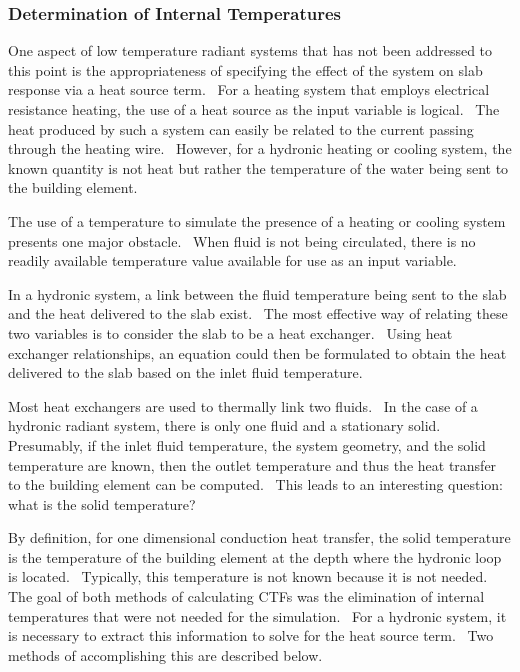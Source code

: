 \subsubsection{Determination of Internal Temperatures}\label{determination-of-internal-temperatures}

One aspect of low temperature radiant systems that has not been addressed to this point is the appropriateness of specifying the effect of the system on slab response via a heat source term.~ For a heating system that employs electrical resistance heating, the use of a heat source as the input variable is logical.~ The heat produced by such a system can easily be related to the current passing through the heating wire.~ However, for a hydronic heating or cooling system, the known quantity is not heat but rather the temperature of the water being sent to the building element.

The use of a temperature to simulate the presence of a heating or cooling system presents one major obstacle.~ When fluid is not being circulated, there is no readily available temperature value available for use as an input variable.

In a hydronic system, a link between the fluid temperature being sent to the slab and the heat delivered to the slab exist.~ The most effective way of relating these two variables is to consider the slab to be a heat exchanger.~ Using heat exchanger relationships, an equation could then be formulated to obtain the heat delivered to the slab based on the inlet fluid temperature.

Most heat exchangers are used to thermally link two fluids.~ In the case of a hydronic radiant system, there is only one fluid and a stationary solid.~ Presumably, if the inlet fluid temperature, the system geometry, and the solid temperature are known, then the outlet temperature and thus the heat transfer to the building element can be computed.~ This leads to an interesting question:~ what is the solid temperature?

By definition, for one dimensional conduction heat transfer, the solid temperature is the temperature of the building element at the depth where the hydronic loop is located.~ Typically, this temperature is not known because it is not needed.~ The goal of both methods of calculating CTFs was the elimination of internal temperatures that were not needed for the simulation.~ For a hydronic system, it is necessary to extract this information to solve for the heat source term.~ Two methods of accomplishing this are described below.

